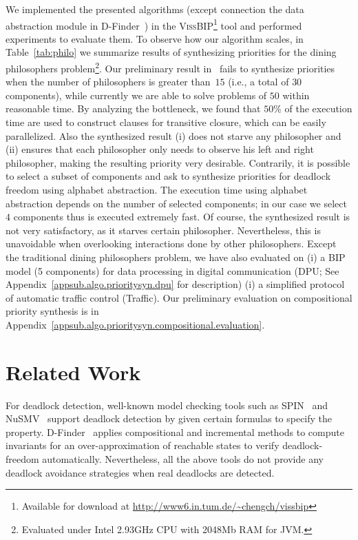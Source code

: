 \documentclass[10pt, a4paper, onecolumn, conference, compsocconf]{IEEEtran}
\begin{document}
We implemented the presented algorithms (except connection the data abstraction module in D-Finder~\cite{bensalem:dfinder2:2011}) in the \textsc{VissBIP}\footnote{Available for download at \url{http://www6.in.tum.de/~chengch/vissbip}} tool and performed experiments to evaluate them. To observe how our algorithm scales, in Table~\ref{tab:philo} we summarize results of synthesizing priorities for the dining philosophers problem\footnote{Evaluated under Intel 2.93GHz CPU with 2048Mb RAM for JVM.}. Our preliminary result in~\cite{cheng:vissbip:2011} fails to synthesize priorities when the number of philosophers is greater than~$15$ (i.e., a total of $30$ components), while currently we are able to solve problems of $50$ within reasonable time. By analyzing the bottleneck, we found that $50\%$ of the execution time are used to construct clauses for transitive closure, which can be easily parallelized. Also the synthesized result (i) does not starve any philosopher and (ii) ensures that each philosopher only needs to observe his left and right philosopher, making the resulting priority very desirable. Contrarily, it is possible to select a subset of components and ask to synthesize priorities for deadlock freedom using alphabet abstraction. The execution time using alphabet abstraction depends on the number of selected components; in our case we select~$4$ components thus is executed extremely fast. Of course, the synthesized result is not very satisfactory, as it starves certain philosopher. Nevertheless, this is unavoidable when overlooking interactions done by other philosophers.
Except the traditional dining philosophers problem, we have also evaluated on  (i) a BIP model (5 components) for data processing in digital communication (DPU; See Appendix~\ref{appsub.algo.prioritysyn.dpu} for description) (i) a simplified protocol of automatic traffic control (Traffic). Our preliminary evaluation on compositional priority synthesis is in Appendix~\ref{appsub.algo.prioritysyn.compositional.evaluation}.

\section{Related Work\label{sec.algo.prioritysyn.related}}

For deadlock detection, well-known model checking tools such as SPIN~\cite{holzmann:2004:smc} and NuSMV~\cite{cimatti1999nns} support deadlock detection by given certain formulas to specify the property.  D-Finder~\cite{bensalem:dfinder2:2011} applies compositional and incremental methods to compute invariants for an over-approximation of reachable states to verify deadlock-freedom automatically. Nevertheless, all the above tools do not provide any deadlock avoidance strategies when real deadlocks are detected.
\end{document}
